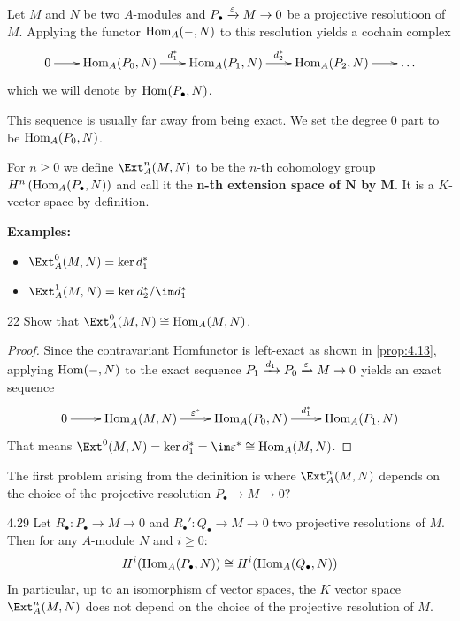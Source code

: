 \documentclass[twoside = false,	%
		headsepline,		%
		parskip = true,
		]{scrbook}						%
\begin{document}
    Let $M$ and $N$ be two $A$-modules and $P_\bullet \xrightarrow{\varepsilon} M \to 0$ be a projective resolutioon of $M$. Applying the functor $\mathrm{Hom}_A(-,N)$ to this resolution yields a cochain complex
    \begin{equation*}
    \xymatrix@C=20pt {
        0 \ar[r] & \Hom_A(P_0,N) \ar[r]^{d_1^*} & \Hom_A(P_1,N) \ar[r]^{d_2^*} & \Hom_A(P_2,N) \ar[r] & \dots
    }
    \end{equation*}
    which we will denote by $\mathrm{Hom}(P_\bullet,N)$.

    This sequence is usually far away from being exact. We set the degree $0$ part to be $\mathrm{Hom}_A(P_0,N)$.

    \begin{definition}{}{}
        For $n \geq 0$ we define $\Ext^n_A(M,N)$ to be the $n$-th cohomology group $H^n\left( \mathrm{Hom}_A(P_\bullet,N)\right)$ and call it the \textbf{n-th extension space of $\mathbf{N}$ by $\mathbf{M}$}. It is a $K$-vector space by definition.
    \end{definition}

    \textbf{Examples:}
    \begin{itemize}
        \item $\Ext^0_A(M,N) = \ker d_1^*$
        \item $\Ext^1_A(M,N) = \ker d_2^*/\im d_1^*$
    \end{itemize}

    \begin{exercise}{}{22}
        Show that $\Ext_A^0(M,N) \cong \Hom_A(M,N)$.
    \end{exercise}

    \begin{proof}
        Since the contravariant Homfunctor is left-exact as shown in \ref{prop:4.13}, applying $\mathrm{Hom}(-,N)$ to the exact sequence $P_1 \xrightarrow{d_1} P_0 \xrightarrow{\varepsilon} M \to 0$ yields an exact sequence
        \begin{equation*}
        \xymatrix {
            0 \ar[r] & \Hom_A(M,N) \ar[r]^{\e^*} & \Hom_A(P_0,N) \ar[r]^{d_1^*} & \Hom_A(P_1,N)
        }
        \end{equation*}
        That means $\Ext^0(M,N) = \ker d_1^* = \im \e^* \cong \Hom_A(M,N)$.
    \end{proof}

    The first problem arising from the definition is where $\Ext_A^n(M,N)$ depends on the choice of the projective resolution $P_\bullet \to M \to 0?$

    \begin{theorem}{}{4.29}
        Let $R_\bullet: P_\bullet \to M \to 0$ and $R_\bullet': Q_\bullet \to M \to 0$ two projective resolutions of $M$. Then for any $A$-module $N$ and $i \geq 0$:
        \begin{equation*}
            H^i(\mathrm{Hom}_A(P_\bullet,N)) \cong H^i(\mathrm{Hom}_A(Q_\bullet,N))
        \end{equation*}
        In particular, up to an isomorphism of vector spaces, the $K$ vector space $\Ext^n_A(M,N)$ does not depend on the choice of the projective resolution of $M$.
    \end{theorem}
\end{document}
